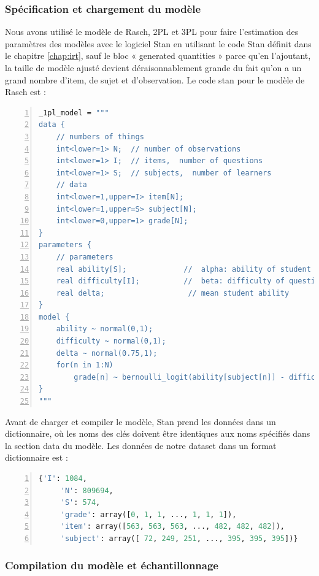 \subsubsection{Spécification et chargement du modèle}
Nous avons utilisé le modèle de Rasch, 2PL et 3PL pour faire l’estimation des paramètres des modèles avec le logiciel Stan en utilisant le code Stan définit dans le chapitre \ref{chap:irt}, sauf le bloc « generated quantities » parce qu’en l'ajoutant, la taille de modèle ajusté devient déraisonnablement grande du fait qu’on a un grand nombre d’item, de sujet et d’observation. Le code stan pour le modèle de Rasch est :
\begin{lstlisting}[language=Stan,basicstyle=\scriptsize, frame=l,framesep=4.5mm,framexleftmargin=2.5mm,tabsize=2,numbers=left,fillcolor=\color{blueforest!70},rulecolor=\color{blueforest},numberstyle=\normalfont\tiny\color{white}]
_1pl_model = """
data {
	// numbers of things
	int<lower=1> N;  // number of observations
	int<lower=1> I;  // items,  number of questions  
	int<lower=1> S;  // subjects,  number of learners 
	// data
	int<lower=1,upper=I> item[N];
	int<lower=1,upper=S> subject[N];
	int<lower=0,upper=1> grade[N];
}
parameters {
	// parameters
	real ability[S];             //  alpha: ability of student
	real difficulty[I];          //  beta: difficulty of question
	real delta;                   // mean student ability
}
model {
	ability ~ normal(0,1);         
	difficulty ~ normal(0,1);   
	delta ~ normal(0.75,1);
	for(n in 1:N)
		grade[n] ~ bernoulli_logit(ability[subject[n]] - difficulty[item[n]] + delta);
}
"""
\end{lstlisting}
Avant de charger et compiler le modèle, Stan prend les données dans un dictionnaire, où les noms des clés doivent être identiques aux noms spécifiés dans la section data du modèle. Les données de notre dataset dans un format dictionnaire est :

\begin{lstlisting}[language=Python,basicstyle=\scriptsize, frame=l,framesep=4.5mm,framexleftmargin=2.5mm,tabsize=2,numbers=left,fillcolor=\color{blueforest!70},rulecolor=\color{blueforest},numberstyle=\normalfont\tiny\color{white}]
	{'I': 1084,
 	 'N': 809694,
 	 'S': 574,
 	 'grade': array([0, 1, 1, ..., 1, 1, 1]),
 	 'item': array([563, 563, 563, ..., 482, 482, 482]),
 	 'subject': array([ 72, 249, 251, ..., 395, 395, 395])}
\end{lstlisting}

\subsubsection{Compilation du modèle et échantillonnage }

